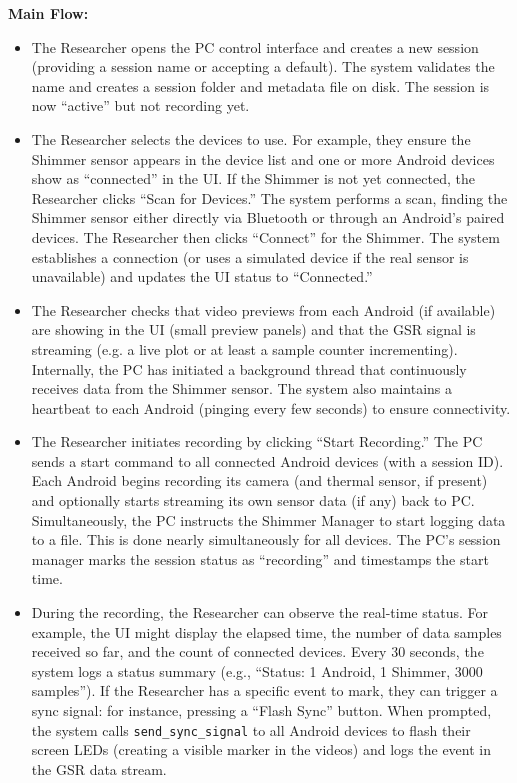 \textbf{Main Flow:}
\begin{itemize}
    \item The Researcher opens the PC control interface and creates a new session (providing a session name or accepting a default). The system validates the name and creates a session folder and metadata file on disk. The session is now ``active'' but not recording yet.
    \item The Researcher selects the devices to use. For example, they ensure the Shimmer sensor appears in the device list and one or more Android devices show as ``connected'' in the UI. If the Shimmer is not yet connected, the Researcher clicks ``Scan for Devices.'' The system performs a scan, finding the Shimmer sensor either directly via Bluetooth or through an Android's paired devices. The Researcher then clicks ``Connect'' for the Shimmer. The system establishes a connection (or uses a simulated device if the real sensor is unavailable) and updates the UI status to ``Connected.''
    \item The Researcher checks that video previews from each Android (if available) are showing in the UI (small preview panels) and that the GSR signal is streaming (e.g. a live plot or at least a sample counter incrementing). Internally, the PC has initiated a background thread that continuously receives data from the Shimmer sensor. The system also maintains a heartbeat to each Android (pinging every few seconds) to ensure connectivity.
    \item The Researcher initiates recording by clicking ``Start Recording.'' The PC sends a start command to all connected Android devices (with a session ID). Each Android begins recording its camera (and thermal sensor, if present) and optionally starts streaming its own sensor data (if any) back to PC. Simultaneously, the PC instructs the Shimmer Manager to start logging data to a file. This is done nearly simultaneously for all devices. The PC's session manager marks the session status as ``recording'' and timestamps the start time.
    \item During the recording, the Researcher can observe the real-time status. For example, the UI might display the elapsed time, the number of data samples received so far, and the count of connected devices. Every 30 seconds, the system logs a status summary (e.g., ``Status: 1 Android, 1 Shimmer, 3000 samples''). If the Researcher has a specific event to mark, they can trigger a sync signal: for instance, pressing a ``Flash Sync'' button. When prompted, the system calls \texttt{send\_sync\_signal} to all Android devices to flash their screen LEDs (creating a visible marker in the videos) and logs the event in the GSR data stream.

\end{itemize}
